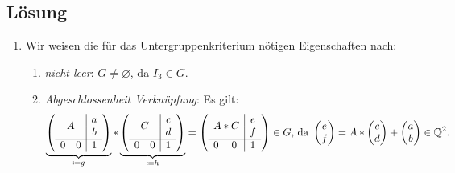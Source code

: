 \subsection{Lösung}
\begin{enumerate}
	\item Wir weisen die für das Untergruppenkriterium nötigen Eigenschaften nach:
	\begin{enumerate}
	 	\item \emph{nicht leer}: \( G \neq \varnothing \), da \( I_3 \in G \).
	 	\item \emph{Abgeschlossenheit Verknüpfung}: Es gilt:
	 	\begin{equation*}
	 		\underbrace{\left( 
				\begin{array}{cc|c}
					\multicolumn{2}{c|}{\multirow{2}{*}{\( A \)}} & a \\
					\multicolumn{2}{c|}{} & b \\
					\hline 
					0 & 0 & 1
				\end{array}
			 \right)}_{\coloneqq g} * \underbrace{\left( 
				\begin{array}{cc|c}
					\multicolumn{2}{c|}{\multirow{2}{*}{\( C \)}} & c \\
					\multicolumn{2}{c|}{} & d \\
					\hline 
					0 & 0 & 1
				\end{array}
			 \right)}_{\coloneqq h} = \left( 
				\begin{array}{cc|c}
					\multicolumn{2}{c|}{\multirow{2}{*}{\( A * C \)}} & e \\
					\multicolumn{2}{c|}{} & f \\
					\hline 
					0 & 0 & 1
				\end{array}
			 \right) \in G \text{, da } \begin{pmatrix}
			 	e \\f
			 \end{pmatrix} = A * \begin{pmatrix}
			 	c \\d
			 \end{pmatrix} + \begin{pmatrix}
			 	a \\ b
			 \end{pmatrix} \in \Q^2 \text{.}
	 	 \end{equation*} 


\end{enumerate}
\end{enumerate}

